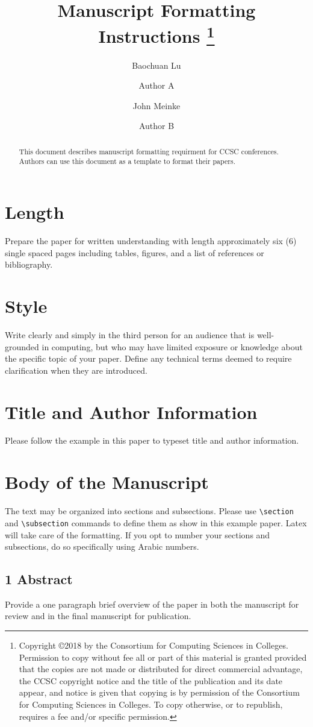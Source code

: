 \documentclass[10pt]{article}
\title{Manuscript Formatting Instructions
\footnote{
Copyright \copyright 2018 by the Consortium for Computing Sciences in Colleges. Permission to copy without fee all or part of this material is granted provided that the copies are not made or distributed for direct commercial advantage, the CCSC copyright notice and the title of the publication and its date appear, and notice is given that copying is by permission of the Consortium for Computing Sciences in Colleges. To copy otherwise, or to republish, requires a fee and/or specific permission.}}
\date{\vspace{-7ex}}
\author[1]{Baochuan Lu}
\author[1]{Author A}
\author[2]{John Meinke}
\author[2]{Author B}
\affil[1]{\footnotesize
Computer and Information Sciences \protect\\
Southwest Baptist University \protect\\
Bolivar, MO 65613}
\affil[ ]{\textit {\{blue,auther\}@sbuniv.edu}}
\affil[2]{\footnotesize
Computer Science Department \protect\\
Excellent University \protect\\ Our Town, TX 00000}
\affil[ ]{\textit {\{email1,email2,email3,email4,email5\}@xyz.edu}}
\begin{document}
\maketitle

\begin{abstract}
This document describes manuscript formatting requirment for CCSC conferences. Authors can use this document as a template to format their papers.
\end{abstract}

\section*{Length}
Prepare the paper for written understanding with length approximately six (6) single spaced pages including tables, figures, and a list of references or bibliography.

\section*{Style}
Write clearly and simply in the third person for an audience that is well-grounded in computing, but who may have limited exposure or knowledge about the specific topic of your paper. Define any technical terms deemed to require clarification when they are introduced.

\section*{Title and Author Information}
Please follow the example in this paper to typeset title and author information.

\section*{Body of the Manuscript}
The text may be organized into sections and subsections. Please use \verb+\section+ and  \verb+\subsection+ commands to define them as show in this example paper. Latex will take care of the formatting. If you opt to number your sections and subsections, do so specifically using Arabic numbers.

\subsection*{1 Abstract}
Provide a one paragraph brief overview of the paper in both the manuscript for review and in the final manuscript for publication.
\end{document}
